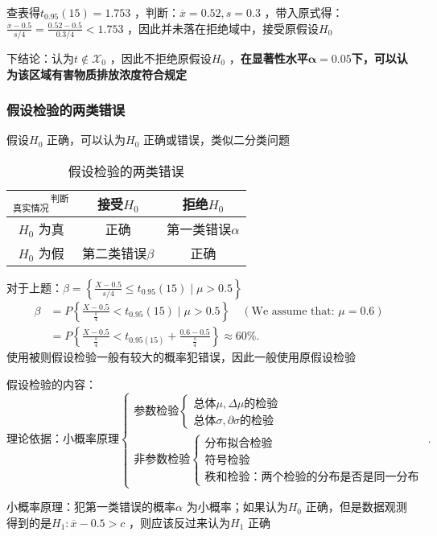 查表得$t_{0.95}\left( 15 \right)=1.753$ ，判断：$\overline{x}=0.52,s=0.3$ ，带入原式得：$\frac{\overline{x}-0.5}{s /4}=\frac{0.52-0.5}{0.3 /4}<1.753$ ，因此并未落在拒绝域中，接受原假设$H_0$

下结论：认为$t\not\in \mathscr{X}_0$ ，因此不拒绝原假设$H_0$ ，\textbf{在显著性水平}$\bm{\alpha}=0.05$\textbf{下，可以认为该区域有害物质排放浓度符合规定}
\subsubsection*{假设检验的两类错误}%
\label{subsub:假设检验的两类错误}
假设$H_0$ 正确，可以认为$H_0$ 正确或错误，类似二分类问题
\begin{table}[htpb]
    \centering
    \caption{假设检验的两类错误}
    \label{tab:假设检验的两类错误}
    \begin{tabular}{|c|c|c|}
    \hline
    $_\text{真实情况}\hspace{1pt}^\text{判断}$ & 接受$H_0$ & 拒绝$H_0$ \\
    \hline
    $H_0$ 为真 & 正确 & 第一类错误$\alpha$ \\
    \hline
    $H_0$ 为假 & 第二类错误$\beta$ & 正确\\
    \hline
    \end{tabular}
\end{table}

对于上题：$\beta=\left\{ \frac{X-0.5}{s /4}\le t_{0.95}\left( 15 \right) \mid \mu>0.5 \right\}$
\begin{align*}
    \beta&=P\left\{ \frac{X-0.5}{\frac{s}{4}}<t_{0.95}\left( 15 \right) \mid \mu>0.5 \right\} \quad \left( \text{We assume that: } \mu=0.6\right) \\
         &= P\left\{ \frac{X-0.5}{\frac{s}{4}}<t_{0.95\left( 15 \right)}+\frac{0.6-0.5}{\frac{s}{4}} \right\} \approx 60\%
.\end{align*}
使用被则假设检验一般有较大的概率犯错误，因此一般使用原假设检验

假设检验的内容：
\[
    \text{理论依据：小概率原理}
    \begin{cases}
        \text{参数检验}\begin{cases}
            \text{总体}\mu,\Delta\mu \text{的检验}\\
            \text{总体}\sigma,\partial\sigma \text{的检验}
        \end{cases}\\
        \text{非参数检验}\begin{cases}
            \text{分布拟合检验}\\
            \text{符号检验}\\
            \text{秩和检验：两个检验的分布是否是同一分布}
        \end{cases}
    \end{cases}
.\]
\begin{notation}
小概率原理：犯第一类错误的概率$\alpha$ 为小概率；如果认为$H_0$ 正确，但是数据观测得到的是$H_1:\overline{x}-0.5>c$ ，则应该反过来认为$H_1$ 正确
\end{notation}
